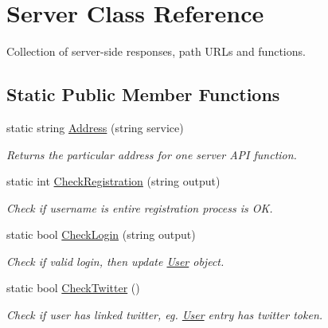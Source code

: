 \hypertarget{class_server}{}\section{Server Class Reference}
\label{class_server}


Collection of server-\/side responses, path U\+R\+Ls and functions.  


\subsection*{Static Public Member Functions}
\begin{DoxyCompactItemize}
\item 
\mbox{\label{class_server_a0a701ca3c73b238ca8808eb05897988c}} 
static string \mbox{\hyperlink{class_server_a0a701ca3c73b238ca8808eb05897988c}{Address}} (string service)
\begin{DoxyCompactList}\small\item\em Returns the particular address for one server A\+PI function. \end{DoxyCompactList}\item 
\mbox{\label{class_server_a4fe4bf9d73c95a59d6f2b07faf93c7a2}} 
static int \mbox{\hyperlink{class_server_a4fe4bf9d73c95a59d6f2b07faf93c7a2}{Check\+Registration}} (string output)
\begin{DoxyCompactList}\small\item\em Check if username is entire registration process is OK. \end{DoxyCompactList}\item 
\mbox{\label{class_server_a14b1c4d9f09ef86474d7675abce7258a}} 
static bool \mbox{\hyperlink{class_server_a14b1c4d9f09ef86474d7675abce7258a}{Check\+Login}} (string output)
\begin{DoxyCompactList}\small\item\em Check if valid login, then update \mbox{\hyperlink{class_user}{User}} object. \end{DoxyCompactList}\item 
\mbox{\label{class_server_aaf401398cccdc041ad7bb2a64c8323f8}} 
static bool \mbox{\hyperlink{class_server_aaf401398cccdc041ad7bb2a64c8323f8}{Check\+Twitter}} ()
\begin{DoxyCompactList}\small\item\em Check if user has linked twitter, eg. \mbox{\hyperlink{class_user}{User}} entry has twitter token. \end{DoxyCompactList}\item 

\end{DoxyCompactItemize}
